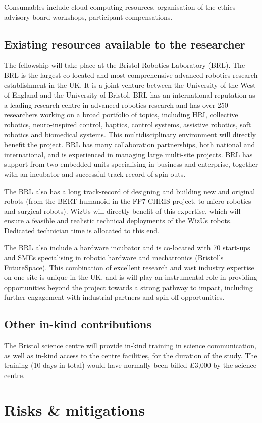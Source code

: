 Consumables include cloud computing resources, organisation of 
the ethics advisory board workshops, participant compensations.

\subsection{Existing resources available to the researcher}

The fellowship will take place at the Bristol Robotics Laboratory (BRL). The BRL
is the largest co-located and most comprehensive advanced robotics research
establishment in the UK. It is a joint venture between the University of the
West of England and the University of Bristol.
BRL has an international reputation as a leading research centre in advanced
robotics research and has over 250 researchers working on a broad portfolio of
topics, including HRI, collective robotics, neuro-inspired control,
haptics, control systems, assistive robotics, soft robotics and biomedical
systems. This multidisciplinary environment will directly benefit the
project. BRL has many collaboration partnerships, both national and
international, and is experienced in managing large multi-site projects. BRL has
support from two embedded units specialising in business and enterprise,
together with an incubator and successful track record of spin-outs.

The BRL also has a long track-record of designing and building new and original
robots (from the BERT humanoid in the FP7 CHRIS project, to micro-robotics and
surgical robots). WizUs will directly benefit of this expertise, which will
ensure a feasible and realistic technical deployments of the WizUs robots.
Dedicated technician time is allocated to this end.

The BRL also include a hardware incubator and is co-located with 70 start-ups
and SMEs specialising in robotic hardware and mechatronics (Bristol’s
FutureSpace). This combination of excellent research and vast industry expertise
on one site is unique in the UK, and is will play an instrumental role in
providing opportunities beyond the project towards a strong pathway to impact,
including further engagement with industrial partners and spin-off
opportunities.

\subsection{Other in-kind contributions}

The Bristol science centre will provide in-kind training in science
communication, as well as in-kind access to the centre facilities, for the
duration of the study. The training (10 days in total) would have normally
been billed £3,000 by the science centre.


\section{Risks \& mitigations}




